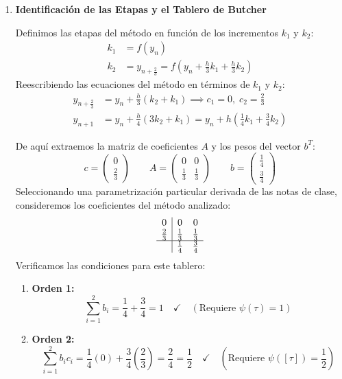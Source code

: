 \begin{sol}

\begin{enumerate}
    \item \textbf{Identificación de las Etapas y el Tablero de Butcher}

    Definimos las etapas del método en función de los incrementos $k_1$ y $k_2$:
\begin{align*}
k_1 &= f(y_n) \\
k_2 & =y_{n+\frac{2}{3}} = f\left(y_n + \frac{h}{3} k_1 + \frac{h}{3} k_2\right)
\end{align*}
Reescribiendo las ecuaciones del método en términos de $k_1$ y $k_2$:
\begin{align*}
y_{n+\frac{2}{3}} &= y_n + \frac{h}{3} (k_2 + k_1) \implies c_1 = 0, \; c_2 = \frac{2}{3} \\
y_{n+1} &= y_n + \frac{h}{4} (3k_2 + k_1) = y_n + h\left(\frac{1}{4} k_1 + \frac{3}{4} k_2\right)
\end{align*}

De aquí extraemos la matriz de coeficientes $A$ y los pesos del vector $b^T$:
$$c = \begin{pmatrix} 0 \\ \frac{2}{3} \end{pmatrix} \qquad A = \begin{pmatrix} 0 & 0 \\ \frac{1}{3} & \frac{1}{3} \end{pmatrix} \qquad b = \begin{pmatrix} \frac{1}{4} \\ \frac{3}{4} \end{pmatrix}$$
Seleccionando una parametrización particular derivada de las notas de clase, consideremos los coeficientes del método analizado:
\[
\begin{array}{c|cc}
0           & 0          & 0          \\
\frac{2}{3} & \frac{1}{3}& \frac{1}{3} \\ \hline
            & \frac{1}{4}& \frac{3}{4}
\end{array}
\]
Verificamos las condiciones para este tablero:
\begin{enumerate}
    \item \textbf{Orden 1:}
    \[
    \sum_{i=1}^2 b_i = \frac{1}{4} + \frac{3}{4} = 1 \quad \checkmark \quad \left(\text{Requiere } \psi(\tau) = 1\right)
    \]
    \item \textbf{Orden 2:}
    \[
    \sum_{i=1}^2 b_i c_i = \frac{1}{4}(0) + \frac{3}{4}\left(\frac{2}{3}\right) = \frac{2}{4} = \frac{1}{2} \quad \checkmark \quad \left(\text{Requiere } \psi([\tau]) = \frac{1}{2}\right)
    \]


\end{enumerate}
\end{enumerate}
\end{sol}
